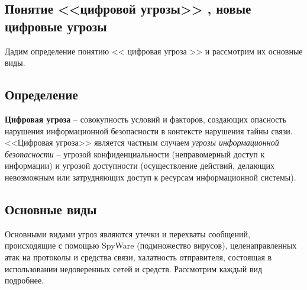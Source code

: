 \parindent=1cm %
\begin{center}
	
	\section{Понятие <<цифровой угрозы>> , новые цифровые угрозы}
	
\end{center}

Дадим определение понятию << цифровая угроза >> и рассмотрим их основные виды.
\subsection{Определение}


	\textbf{Цифровая угроза} -- совокупность условий и факторов, создающих опасность нарушения информационной безопасности  в контексте нарушения тайны связи.%
<<Цифровая угроза>> является частным случаем \textit{угрозы информационной безопасности} -- угрозой конфиденциальности (неправомерный доступ к информации) и угрозой доступности (осуществление действий, делающих невозможным или затрудняющих доступ к ресурсам информационной системы). 


\subsection{Основные виды}

	Основными видами угроз являются  утечки и перехваты сообщений, происходящие с помощью  SpyWare (подмножество вирусов),  целенаправленных атак  на протоколы и средства связи, халатность отправителя, состоящая в использовании недоверенных  сетей и средств. Рассмотрим каждый вид  подробнее.
	
